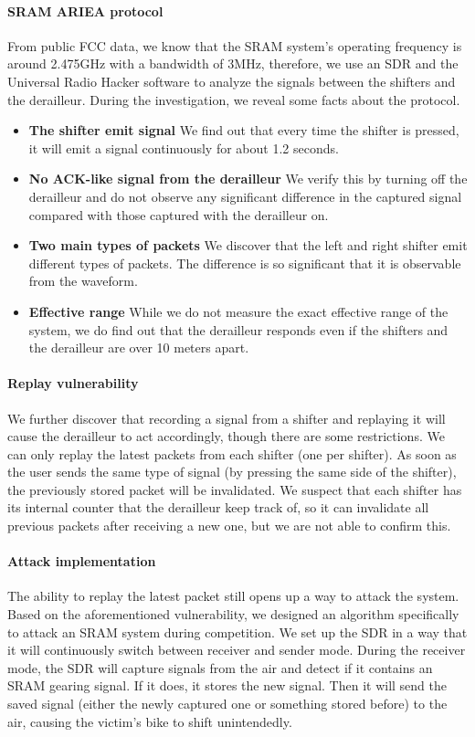 \documentclass[letterpaper,twocolumn,10pt]{article}
\begin{document}
\paragraph{SRAM ARIEA protocol} From public FCC data, we know that the SRAM system's operating frequency is around 2.475GHz with a bandwidth of 3MHz, therefore, we use an SDR and the Universal Radio Hacker software\cite{urh} to analyze the signals between the shifters and the derailleur. During the investigation, we reveal some facts about the protocol.
\begin{itemize}
  \item \textbf{The shifter emit signal} We find out that every time the shifter is pressed, it will emit a signal continuously for about 1.2 seconds.
  \item \textbf{No ACK-like signal from the derailleur} We verify this by turning off the derailleur and do not observe any significant difference in the captured signal compared with those captured with the derailleur on.
  \item \textbf{Two main types of packets} We discover that the left and right shifter emit different types of packets. The difference is so significant that it is observable from the waveform.
  \item \textbf{Effective range} While we do not measure the exact effective range of the system, we do find out that the derailleur responds even if the shifters and the derailleur are over 10 meters apart.
\end{itemize}

\paragraph{Replay vulnerability}
We further discover that recording a signal from a shifter and replaying it will cause the derailleur to act accordingly, though there are some restrictions. We can only replay the latest packets from each shifter (one per shifter). As soon as the user sends the same
type of signal (by pressing the same side of the shifter), the previously stored packet will be invalidated. We suspect that each shifter has its internal counter that the derailleur keep track of, so it can invalidate all previous packets after receiving a new one, but we are not able to confirm this.

\paragraph{Attack implementation} The ability to replay the latest packet still opens up a way to attack the system. Based on the aforementioned vulnerability, we designed an algorithm specifically to attack an SRAM system during competition. We set up the SDR in a way that it will continuously switch between receiver and sender mode. During the receiver mode, the SDR will capture signals from the air and detect if it contains an SRAM gearing signal. If it does, it stores the new signal. Then it will send the saved signal (either the newly captured one or something stored before) to the air, causing the victim's bike to shift unintendedly.
\end{document}

